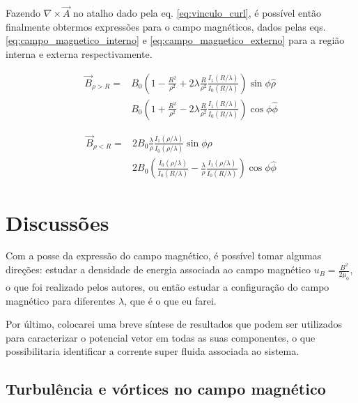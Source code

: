\documentclass[%
 reprint,
 amsmath,amssymb,
 aps,
]{revtex4-1}
\begin{document}
Fazendo $\nabla \times \vec{A}$ no atalho dado pela eq. \ref{eq:vinculo_curl}, é possível então finalmente obtermos expressões para o campo magnéticos, dados pelas eqs. \ref{eq:campo_magnetico_interno} e \ref{eq:campo_magnetico_externo} para a região interna e externa respectivamente.

\begin{equation}
    \label{eq:campo_magnetico_interno}
    \begin{split}
        \vec{B}_{\rho>R} = &B_0 (1 - \frac{R^2}{\rho^2} + 2 \lambda \frac{R}{\rho^2} \frac{I_1(R/\lambda)}{I_0(R/\lambda)})\sin{\phi}\hat{\rho} \\
        &B_0 (1 + \frac{R^2}{\rho^2} - 2 \lambda \frac{R}{\rho^2} \frac{I_1(R/\lambda)}{I_0(R/\lambda)})\cos{\phi}\hat{\phi}
    \end{split}
\end{equation}

\begin{equation}
    \label{eq:campo_magnetico_externo}
    \begin{split}
        \vec{B}_{\rho<R} = &2B_0 \frac{\lambda}{\rho} \frac{I_1(\rho/\lambda)}{I_0(\rho/\lambda)}\sin{\phi}\rho \\
        &2B_0(\frac{I_0(\rho/\lambda)}{I_0(R/\lambda)} - \frac{\lambda}{\rho}\frac{I_1(\rho / \lambda)}{I_0(R / \lambda)}) \cos{\phi} \hat{\phi}
    \end{split}
\end{equation}



\section{Discussões}


Com a posse da expressão do campo magnético, é possível tomar algumas direções: estudar a densidade de energia associada ao campo magnético $u_B = \frac{B^2}{2 \mu_0}$, o que foi realizado pelos autores, ou então estudar a configuração do campo magnético para diferentes $\lambda$, que é o que eu farei.

Por último, colocarei uma breve síntese de resultados que podem ser utilizados para caracterizar o potencial vetor em todas as suas componentes, o que possibilitaria identificar a corrente super fluida associada ao sistema.

\subsection{Turbulência e vórtices no campo magnético}
\end{document}
